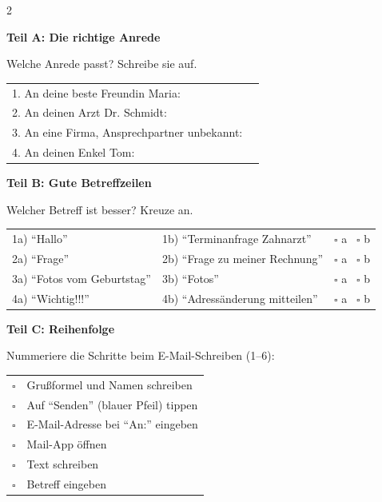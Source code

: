 \documentclass[a4paper,landscape,8pt]{extarticle}
\begin{document}
\begin{multicols}{2}

\textbf{\large Teil A: Die richtige Anrede}

Welche Anrede passt? Schreibe sie auf.

\vspace{2mm}

\renewcommand{\arraystretch}{2}
\begin{tabular}{@{}p{5.5cm}p{6cm}@{}}
1. An deine beste Freundin Maria: & \dotfill \\
2. An deinen Arzt Dr. Schmidt: & \dotfill \\
3. An eine Firma, Ansprechpartner unbekannt: & \dotfill \\
4. An deinen Enkel Tom: & \dotfill \\
\end{tabular}
\renewcommand{\arraystretch}{1}

\vspace{6mm}

\textbf{\large Teil B: Gute Betreffzeilen}

Welcher Betreff ist besser? Kreuze an.

\vspace{2mm}

\renewcommand{\arraystretch}{1.8}
\begin{tabular}{@{}p{5cm}p{5cm}c@{}}
1a) ``Hallo'' & 1b) ``Terminanfrage Zahnarzt'' & $\square$ a ~$\square$ b \\
2a) ``Frage'' & 2b) ``Frage zu meiner Rechnung'' & $\square$ a ~$\square$ b \\
3a) ``Fotos vom Geburtstag'' & 3b) ``Fotos'' & $\square$ a ~$\square$ b \\
4a) ``Wichtig!!!'' & 4b) ``Adressänderung mitteilen'' & $\square$ a ~$\square$ b \\
\end{tabular}
\renewcommand{\arraystretch}{1}

\vspace{6mm}

\textbf{\large Teil C: Reihenfolge}

Nummeriere die Schritte beim E-Mail-Schreiben (1--6):

\vspace{2mm}

\renewcommand{\arraystretch}{1.8}
\begin{tabular}{@{}cp{8cm}@{}}
$\square$ & Grußformel und Namen schreiben \\
$\square$ & Auf ``Senden'' (blauer Pfeil) tippen \\
$\square$ & E-Mail-Adresse bei ``An:'' eingeben \\
$\square$ & Mail-App öffnen \\
$\square$ & Text schreiben \\
$\square$ & Betreff eingeben \\
\end{tabular}
\renewcommand{\arraystretch}{1}


\end{multicols}
\end{document}
